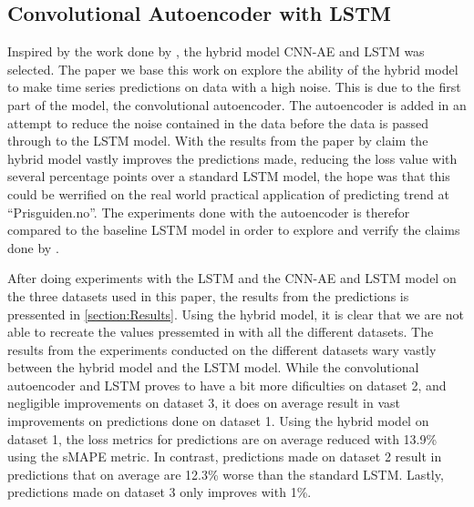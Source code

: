 
\subsection{Convolutional Autoencoder with LSTM}
\label{section:Discussion:Discussion:CNN-AE-LSTM}



Inspired by the work done by \cite{Zhao2019}, the hybrid model CNN-AE and LSTM was selected.
The paper we base this work on explore the ability of the hybrid model to make time series predictions
on data with a high noise.
This is due to the first part of the model, the convolutional autoencoder.
The autoencoder is added in an attempt to reduce the noise contained in the data before the data is passed through to the LSTM model.
With the results from the paper by \cite{Zhao2019} claim the hybrid model vastly improves the predictions made, reducing the loss value with
several percentage points over a standard LSTM model, the hope was that this could be werrified on the real world practical application of
predicting trend at ``Prisguiden.no''.
The experiments done with the autoencoder is therefor compared to the baseline LSTM model in order to explore and verrify the claims done by
\cite{Zhao2019}.


After doing experiments with the LSTM and the CNN-AE and LSTM model on the three datasets used in this paper,
the results from the predictions is pressented in \cref{section:Results}.
Using the hybrid model, it is clear that we are not able to recreate the values pressemted in \cite{Zhao2019}
with all the different datasets.
The results from the experiments conducted on the different datasets wary vastly between the hybrid model and the LSTM model.
While the convolutional autoencoder and LSTM proves to have a bit more dificulties on dataset 2, and negligible improvements on dataset 3,
it does on average result in vast improvements on predictions done on dataset 1.
Using the hybrid model on dataset 1, the loss metrics for predictions are on average reduced with 13.9\% using the sMAPE metric.
In contrast, predictions made on dataset 2 result in predictions that on average are 12.3\% worse than the standard LSTM.
Lastly, predictions made on dataset 3 only improves with 1\%.


